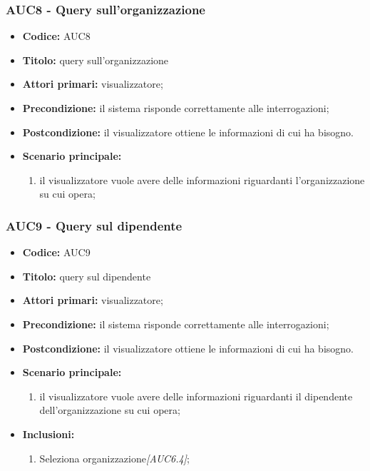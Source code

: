 \documentclass[casi-duso]{subfiles}
\begin{document}
\subsubsection{AUC8 - Query sull'organizzazione}%
\label{subsub:AUC8}
\begin{itemize}
  \item \textbf{Codice:} AUC8
  \item \textbf{Titolo:} query sull'organizzazione
  \item \textbf{Attori primari:} visualizzatore;
  \item \textbf{Precondizione:} il sistema risponde correttamente alle interrogazioni;
  \item \textbf{Postcondizione:} il visualizzatore ottiene le informazioni di cui ha bisogno.
  \item \textbf{Scenario principale:}
  \begin{enumerate}
    \item il visualizzatore vuole avere delle informazioni riguardanti l'organizzazione su cui opera;
  \end{enumerate}
\end{itemize}

\subsubsection{AUC9 - Query sul dipendente}%
\label{subsub:AUC9}
\begin{itemize}
  \item \textbf{Codice:} AUC9
  \item \textbf{Titolo:} query sul dipendente
  \item \textbf{Attori primari:} visualizzatore;
  \item \textbf{Precondizione:} il sistema risponde correttamente alle interrogazioni;
  \item \textbf{Postcondizione:} il visualizzatore ottiene le informazioni di cui ha bisogno.
  \item \textbf{Scenario principale:}
  \begin{enumerate}
    \item il visualizzatore vuole avere delle informazioni riguardanti il dipendente dell'organizzazione su cui opera;
  \end{enumerate}
  \item \textbf{Inclusioni:}
  \begin{enumerate}
    \item Seleziona organizzazione\emph{[AUC6.4]};
  \end{enumerate}
\end{itemize}
\end{document}

